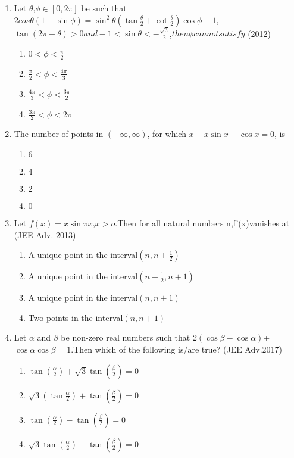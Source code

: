 \documentclass[journal,12pt,twocolumn]{IEEEtran}
\theoremstyle{remark}
\begin{document}
\begin{enumerate}
\item Let $\theta$,$\phi \in[0,2\pi]$ be such that$2 cos\theta(1-\sin\phi)= 
\sin^2\theta(\tan\frac{\theta}{2}+\cot\frac{\theta}{2})\cos\phi-1$,$\tan(2\pi-\theta)>0 and -1<\sin\theta<-\frac{\sqrt{3}}{2}$,$ then \phi cannot satisfy$ \hfill(2012)
\begin{enumerate}
    \item $0<\phi<\frac{\pi}{2}$
    \item $\frac{\pi}{2}<\phi<\frac{4\pi}{3}$
    \item $\frac{4\pi}{3}<\phi<\frac{3\pi}{2}$
    \item $\frac{3\pi}{2}<\phi<2\pi$
\end{enumerate}
\item The number of points in $(-\infty, \infty)$, for which $x - x \sin x - \cos x = 0$, is 
\begin{enumerate}
    \item $6$
    \item $4$
    \item $2$
    \item $0$
\end{enumerate}
\item Let $f(x)=x\sin\pi x $,$ x>o $.Then for all  natural numbers n,f'(x)vanishes at
\hfill(JEE Adv. 2013)
\begin{enumerate}
    \item A unique point in the interval$(n,n+\frac{1}{2})$
    \item A unique point in the interval$(n+\frac{1}{2},n+1)$
    \item A unique point in the interval$(n,n+1)$
    \item Two points in the interval$(n,n+1)$
\end{enumerate}
\item Let $\alpha$ and $\beta$ be non-zero real numbers such that 2$(\cos \beta - \cos \alpha)$+$\cos \alpha \cos \beta=1$.Then which of the following is/are true? \hfill(JEE Adv.2017)
\begin{enumerate}
    \item $\tan(\frac{\alpha}{2})+\sqrt{3}\tan(\frac{\beta}{2})=0$
    \item $\sqrt{3}(\tan\frac{\alpha}{2})+\tan(\frac{\beta}{2})=0$
    \item $\tan(\frac{\alpha}{2})-\tan(\frac{\beta}{2})=0$
    \item $\sqrt{3}\tan(\frac{\alpha}{2})-\tan(\frac{\beta}{2})=0$
\end{enumerate}


\end{enumerate}
\end{document}
